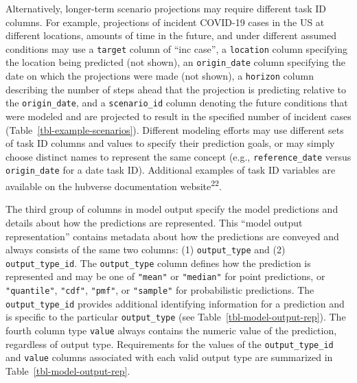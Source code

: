 \documentclass[
  letterpaper,
  DIV=11,
  numbers=noendperiod]{scrartcl}
\begin{document}
Alternatively, longer-term scenario projections may require different
task ID columns. For example, projections of incident COVID-19 cases in
the US at different locations, amounts of time in the future, and under
different assumed conditions may use a \texttt{target} column of ``inc
case'', a \texttt{location} column specifying the location being
predicted (not shown), an \texttt{origin\_date} column specifying the
date on which the projections were made (not shown), a \texttt{horizon}
column describing the number of steps ahead that the projection is
predicting relative to the \texttt{origin\_date}, and a
\texttt{scenario\_id} column denoting the future conditions that were
modeled and are projected to result in the specified number of incident
cases (Table~\ref{tbl-example-scenarios}). Different modeling efforts
may use different sets of task ID columns and values to specify their
prediction goals, or may simply choose distinct names to represent the
same concept (e.g., \texttt{reference\_date} versus
\texttt{origin\_date} for a date task ID). Additional examples of task
ID variables are available on the hubverse documentation
website\textsuperscript{22}.

The third group of columns in model output specify the model predictions
and details about how the predictions are represented. This ``model
output representation'' contains metadata about how the predictions are
conveyed and always consists of the same two columns: (1)
\texttt{output\_type} and (2) \texttt{output\_type\_id}. The
\texttt{output\_type} column defines how the prediction is represented
and may be one of \texttt{"mean"} or \texttt{"median"} for point
predictions, or \texttt{"quantile"}, \texttt{"cdf"}, \texttt{"pmf"}, or
\texttt{"sample"} for probabilistic predictions. The
\texttt{output\_type\_id} provides additional identifying information
for a prediction and is specific to the particular \texttt{output\_type}
(see Table~\ref{tbl-model-output-rep}). The fourth column type
\texttt{value} always contains the numeric value of the prediction,
regardless of output type. Requirements for the values of the
\texttt{output\_type\_id} and \texttt{value} columns associated with
each valid output type are summarized in
Table~\ref{tbl-model-output-rep}.
\end{document}
